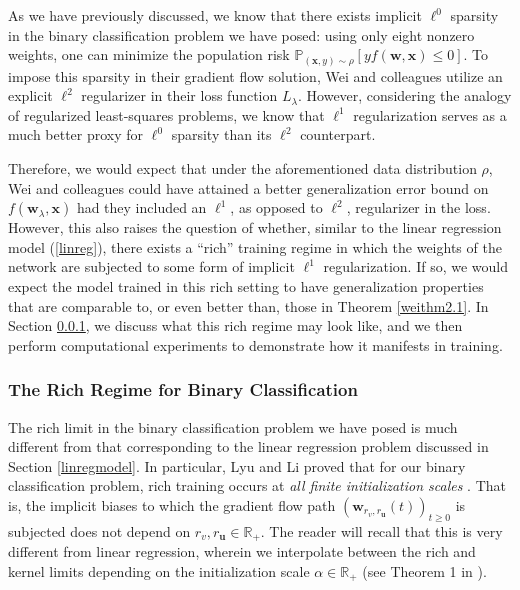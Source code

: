 \documentclass{article}
\begin{document}
As we have previously discussed, we know that there exists implicit $\ell^0$ sparsity in the binary classification problem we have posed: using only eight nonzero weights, one can minimize the population risk $\mathbb{P}_{(\boldsymbol{x}, y) \sim \rho} \left[ y f(\boldsymbol{w}, \boldsymbol{x}) \leq 0 \right]$. To impose this sparsity in their gradient flow solution, Wei and colleagues utilize an explicit $\ell^2$ regularizer in their loss function $L_{\lambda}$. However, considering the analogy of regularized least-squares problems, we know that $\ell^1$ regularization serves as a much better proxy for $\ell^0$ sparsity than its $\ell^2$ counterpart.

Therefore, we would expect that under the aforementioned data distribution $\rho$, Wei and colleagues could have attained a better generalization error bound on $f(\boldsymbol{w}_{\lambda}, \boldsymbol{x})$ had they included an $\ell^1$, as opposed to $\ell^2$, regularizer in the loss. However, this also raises the question of whether, similar to the linear regression model (\ref{linreg}), there exists a \enquote{rich} training regime in which the weights of the network are subjected to some form of implicit $\ell^1$ regularization. If so, we would expect the model trained in this rich setting to have generalization properties that are comparable to, or even better than, those in Theorem \ref{weithm2.1}. In Section \ref{richbinary}, we discuss what this rich regime may look like, and we then perform computational experiments to demonstrate how it manifests in training.

\subsubsection{The Rich Regime for Binary Classification}\label{richbinary}

The rich limit in the binary classification problem we have posed is much different from that corresponding to the linear regression problem discussed in Section \ref{linregmodel}. In particular, Lyu and Li proved that for our binary classification problem, rich training occurs at \textit{all finite initialization scales} \cite{lyu2019gradient}. That is, the implicit biases to which the gradient flow path $(\boldsymbol{w}_{r_v, r_{\boldsymbol{u}}}(t))_{t \geq 0}$ is subjected does not depend on $r_v, r_{\boldsymbol{u}} \in \mathbb{R}_{+}$. The reader will recall that this is very different from linear regression, wherein we interpolate between the rich and kernel limits depending on the initialization scale $\alpha \in \mathbb{R}_+$ (see Theorem 1 in \cite{woodworth2020kernel}). 
\end{document}
